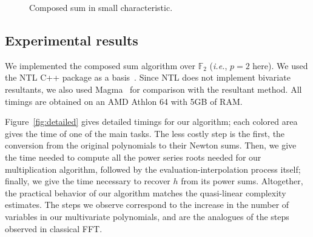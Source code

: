 \documentclass[amsthm]{elsart}
\def\F {\ensuremath{\mathbb{F}}}
\theoremstyle{plain}
\begin{document}
\begin{figure}[!!!h]
\begin{center}
\caption{Composed sum in small characteristic.}
\label{Fig:composed_sum}
\end{center}
\end{figure}



\subsection{Experimental results}

We implemented the composed sum algorithm over $\F_2$ ({\it i.e.},
$p=2$ here). We used the NTL C++ package as a basis~\cite{NTL}. Since
NTL does not implement bivariate resultants, we also used
Magma~\cite{magma} for comparison with the resultant method. All
timings are obtained on an AMD Athlon 64 with 5GB of RAM.

Figure~\ref{fig:detailed} gives detailed timings for our algorithm;
each colored area gives the time of one of the main tasks. The less
costly step is the first, the conversion from the original polynomials
to their Newton sums. Then, we give the time needed to compute all the
power series roots needed for our multiplication algorithm, followed
by the evaluation-interpolation process itself; finally, we give the
time necessary to recover $h$ from its power sums. Altogether, the
practical behavior of our algorithm matches the quasi-linear
complexity estimates. The steps we observe correspond to the increase
in the number of variables in our multivariate polynomials, and are
the analogues of the steps observed in classical FFT.
\end{document}
